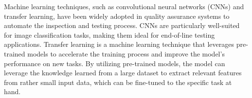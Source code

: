\documentclass[lettersize,journal]{IEEEtran}
\begin{document}
Machine learning techniques, such as convolutional neural networks (CNNs) and transfer learning, have been widely adopted in quality assurance systems to automate the inspection and testing process. CNNs are particularly well-suited for image classification tasks, making them ideal for end-of-line testing applications. Transfer learning is a machine learning technique that leverages pre-trained models to accelerate the training process and improve the model's performance on new tasks. By utilizing pre-trained models, the model can leverage the knowledge learned from a large dataset to extract relevant features from rather small input data, which can be fine-tuned to the specific task at hand.





\end{document}

